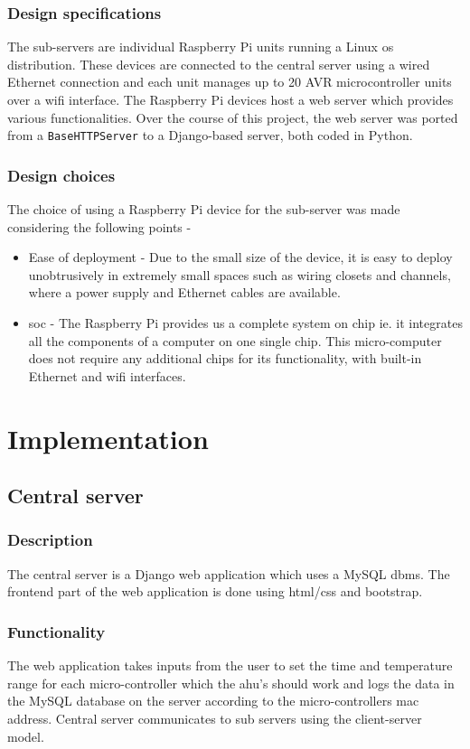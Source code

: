 \documentclass[letterpaper,11pt]{report}
\begin{document}
\subsection{Design specifications}
The sub-servers are individual Raspberry Pi units running a Linux \ac{os} distribution. These devices are connected to the central server using a wired Ethernet connection and each unit manages up to 20 AVR microcontroller units over a \ac{wifi} interface. The Raspberry Pi devices host a web server which provides various functionalities. Over the course of this project, the web server was ported from a \verb|BaseHTTPServer| to a Django-based server, both coded in Python.
\subsection{Design choices}
The choice of using a Raspberry Pi device for the sub-server was made considering the following points -
\begin{itemize}
    \item Ease of deployment - Due to the small size of the device, it is easy to deploy unobtrusively in extremely small spaces such as wiring closets and channels, where a power supply and Ethernet cables are available.
    \item \ac{soc} - The Raspberry Pi provides us a complete system on chip ie. it integrates all the components of a computer on one single chip. This micro-computer does not require any additional chips for its functionality, with built-in Ethernet and \ac{wifi} interfaces.
\end{itemize}

\newpage
\chapter{Implementation}\label{chapter:Implementation}
\onehalfspacing
\section{Central server}
\subsection{Description}
The central server is a Django web application which uses a MySQL \ac{dbms}. The frontend part of the web application is done using \ac{html}/\ac{css} and bootstrap.
\subsection{Functionality}
The web application takes inputs from the user to set the time and temperature range for each micro-controller which the \ac{ahu}'s should work and logs the data in the MySQL database on the server according to the micro-controllers \ac{mac} address. Central server communicates to sub servers using the client-server model.
\end{document}
